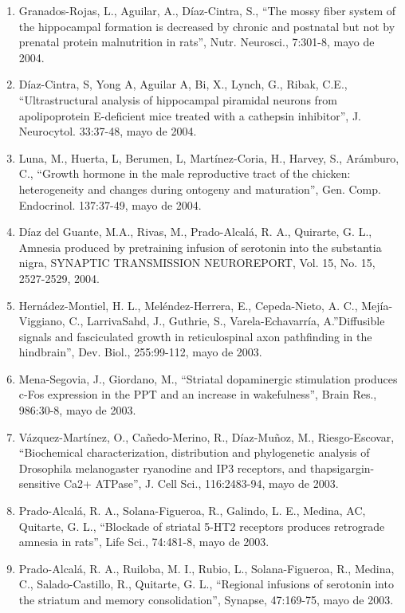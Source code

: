 \begin{enumerate}
\item Granados-Rojas, L., Aguilar, A., Díaz-Cintra, S., “The mossy fiber system of the hippocampal formation is decreased by chronic and postnatal but not by 
prenatal protein malnutrition in rats”, Nutr. Neurosci., 7:301-8,  mayo de 2004.

\item Díaz-Cintra, S, Yong A, Aguilar A, Bi, X., Lynch, G., Ribak, C.E., “Ultrastructural analysis of hippocampal piramidal neurons from apolipoprotein 
E-deficient mice treated with a cathepsin inhibitor”, J. Neurocytol. 33:37-48,  mayo de 2004.
\item Luna, M., Huerta, L, Berumen, L, Martínez-Coria, H., Harvey, S., Arámburo, C., “Growth hormone in the male reproductive tract of the chicken: heterogeneity 
and changes during ontogeny and maturation”, Gen. Comp. Endocrinol. 137:37-49,  mayo de 2004.

\item Díaz del Guante, M.A., Rivas, M., Prado-Alcalá, R. A., Quirarte, G. L., Amnesia produced by pretraining infusion of serotonin into the substantia nigra, 
SYNAPTIC TRANSMISSION NEUROREPORT, Vol. 15, No. 15, 2527-2529,  2004.

\item Hernádez-Montiel, H. L., Meléndez-Herrera, E., Cepeda-Nieto, A. C., Mejía-Viggiano, C., LarrivaSahd, J., Guthrie, S., Varela-Echavarría, A.”Diffusible 
signals and fasciculated growth in reticulospinal axon pathfinding in the hindbrain”, Dev. Biol., 255:99-112,  mayo de 2003.

\item Mena-Segovia, J., Giordano, M., “Striatal dopaminergic stimulation produces c-Fos expression in the PPT and an increase in wakefulness”, Brain Res., 
986:30-8,  mayo de 2003.

\item Vázquez-Martínez, O., Cañedo-Merino, R., Díaz-Muñoz, M., Riesgo-Escovar, “Biochemical characterization, distribution and phylogenetic analysis of 
Drosophila 
melanogaster ryanodine and IP3 receptors, and thapsigargin-sensitive Ca2+ ATPase”, J. Cell Sci., 116:2483-94,  mayo de 2003.

\item Prado-Alcalá, R. A., Solana-Figueroa, R., Galindo, L. E., Medina, AC, Quitarte, G. L., “Blockade of striatal 5-HT2 receptors produces retrograde amnesia in 
rats”, Life Sci., 74:481-8,  mayo de 2003.

\item Prado-Alcalá, R. A., Ruiloba, M. I., Rubio, L., Solana-Figueroa, R., Medina, C., Salado-Castillo, R., Quitarte, G. L., “Regional infusions of serotonin 
into 
the striatum and memory consolidation”, Synapse, 47:169-75,  mayo de 2003.


\end{enumerate}
